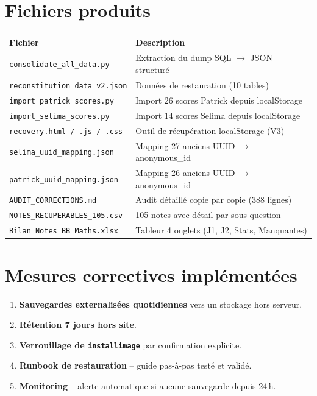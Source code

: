 \documentclass[11pt,a4paper]{article}
\begin{document}
\section{Fichiers produits}

\begin{center}
	\renewcommand{\arraystretch}{1.2}
	\small
	\begin{tabularx}{\linewidth}{lX}
		\toprule
		\rowcolor{grisFond}
		\textbf{\sffamily Fichier}             & \textbf{\sffamily Description}                      \\
		\midrule
		\texttt{consolidate\_all\_data.py}     & Extraction du dump SQL $\to$ JSON structur\'{e}     \\
		\midrule
		\texttt{reconstitution\_data\_v2.json} & Donn\'{e}es de restauration (10 tables)             \\
		\midrule
		\texttt{import\_patrick\_scores.py}    & Import 26 scores Patrick depuis localStorage        \\
		\midrule
		\texttt{import\_selima\_scores.py}     & Import 14 scores Selima depuis localStorage         \\
		\midrule
		\texttt{recovery.html / .js / .css}    & Outil de r\'{e}cup\'{e}ration localStorage (V3)     \\
		\midrule
		\texttt{selima\_uuid\_mapping.json}    & Mapping 27 anciens UUID $\to$ anonymous\_id         \\
		\midrule
		\texttt{patrick\_uuid\_mapping.json}   & Mapping 26 anciens UUID $\to$ anonymous\_id         \\
		\midrule
		\texttt{AUDIT\_CORRECTIONS.md}         & Audit d\'{e}taill\'{e} copie par copie (388 lignes) \\
		\midrule
		\texttt{NOTES\_RECUPERABLES\_105.csv}  & 105 notes avec d\'{e}tail par sous-question         \\
		\midrule
		\texttt{Bilan\_Notes\_BB\_Maths.xlsx}  & Tableur 4 onglets (J1, J2, Stats, Manquantes)       \\
		\bottomrule
	\end{tabularx}
\end{center}

\section{Mesures correctives impl\'{e}ment\'{e}es}

\begin{enumerate}
	\item \textbf{Sauvegardes externalis\'{e}es quotidiennes} vers un stockage hors serveur.
	\item \textbf{R\'{e}tention 7 jours hors site}.
	\item \textbf{Verrouillage de \texttt{installimage}} par confirmation explicite.
	\item \textbf{Runbook de restauration} -- guide pas-\`{a}-pas test\'{e} et valid\'{e}.
	\item \textbf{Monitoring} -- alerte automatique si aucune sauvegarde depuis 24\,h.
\end{enumerate}
\end{document}

